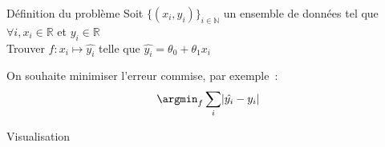 \begin{frame}{Définition du problème}
  Soit $\{(x_i, y_i)\}_{i \in \mathbb{N}}$ un ensemble de données tel que $\forall i, x_i \in \mathbb{R}$ et $y_i \in \mathbb{R}$ \\

  Trouver $f: x_i \mapsto \hat{y_i}$ telle que $\hat{y_i} = \theta_0 + \theta_1 x_i$

  On souhaite minimiser l'erreur commise, par exemple~:
  \[
    \argmin_f \sum_i \lvert \hat{y_i} - y_i \rvert
  \]
\end{frame}

\begin{frame}{Visualisation}
\end{frame}
